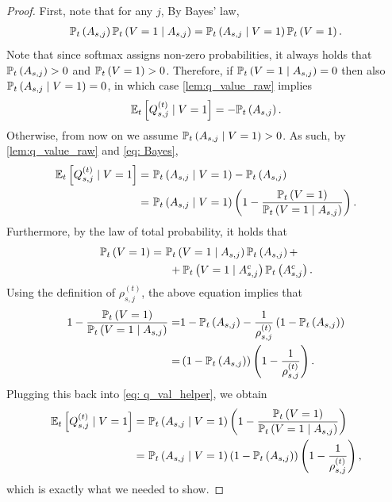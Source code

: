 \documentclass{article}
\theoremstyle{plain}
\theoremstyle{definition}
\theoremstyle{remark}
\begin{document}
\begin{proof}
    First, note that for any $j$, By Bayes' law, 
    \begin{align}\label{eq: Bayes}
        \P_t\left(A_{s,j}\right) \P_t\left(V=1 \mid A_{s,j} \right)
        = \P_t\left(A_{s,j} \mid V=1\right)
        \P_t\left(V=1\right). 
    \end{align}
    Note that since softmax assigns non-zero probabilities, it always holds that $\P_t\left(A_{s,j}\right) > 0$ and $\P_t\left(V=1\right) > 0$. Therefore, if $\P_t\left(V=1 \mid A_{s,j}\right)=0$ then also $\P_t\left(A_{s,j} \mid V=1\right)=0$, in which case \cref{lem:q_value_raw} implies
    \begin{align*}
        \E_t\left[Q^{(t)}_{s, j} \mid V=1\right] = - \P_t\left(A_{s,j}\right).
    \end{align*}
    Otherwise, from now on we assume $\P_t\left(A_{s,j} \mid V=1\right)>0$. As such, by \cref{lem:q_value_raw} and \eqref{eq: Bayes}, 
    \begin{align}\label{eq: q_val_helper}
        \E_t\left[Q^{(t)}_{s, j} \mid V=1\right] = &~ \P_t\left(A_{s,j} \mid V=1\right) - \P_t\left(A_{s,j}\right) \nonumber\\ 
        = &~ \P_t\left(A_{s,j} \mid V=1\right)\left(1 - \frac{\P_t\left(V=1\right)}{\P_t\left(V=1 \mid A_{s,j} \right)}\right).
    \end{align}
    Furthermore, by the law of total probability, it holds that
    \begin{align*}
        \P_t\left(V=1\right) 
        = & ~ \P_t\left(V=1 \mid A_{s,j} \right) \P_t\left(A_{s,j}\right) + \\
        & ~~ + \P_t\left(V=1 \mid A_{s,j}^c \right) \P_t\left(A_{s,j}^c\right).
    \end{align*}
    Using the definition of $\rho_{s, j}^{(t)}$, the above equation implies that
    \begin{align*}
        1 - \frac{\P_t\left(V=1\right)}{\P_t\left(V=1 \mid A_{s,j} \right)} 
        = & 1 - \P_t\left(A_{s,j}\right) 
        - \frac{1}{\rho_{s, j}^{(t)}} \left(1 - \P_t\left(A_{s,j}\right)\right) \\ 
        = & \left(1 - \P_t\left(A_{s,j}\right)\right)\left(1 - \frac{1}{\rho_{s, j}^{(t)}}\right).
    \end{align*}
    Plugging this back into \eqref{eq: q_val_helper}, we obtain
    \begin{align*}
        \E_t\left[Q^{(t)}_{s, j} \mid V=1\right] 
        = &~ \P_t\left(A_{s,j} \mid V=1\right)
        \left(1 - \frac{\P_t\left(V=1\right)}{\P_t\left(V=1 \mid A_{s,j} \right)}\right) \\ 
        = &~ \P_t\left(A_{s,j} \mid V=1\right)\left(1 - \P_t\left(A_{s,j}\right)\right)\left(1 - \frac{1}{\rho_{s, j}^{(t)}}\right),
    \end{align*}
    which is exactly what we needed to show.
\end{proof}
\end{document}
